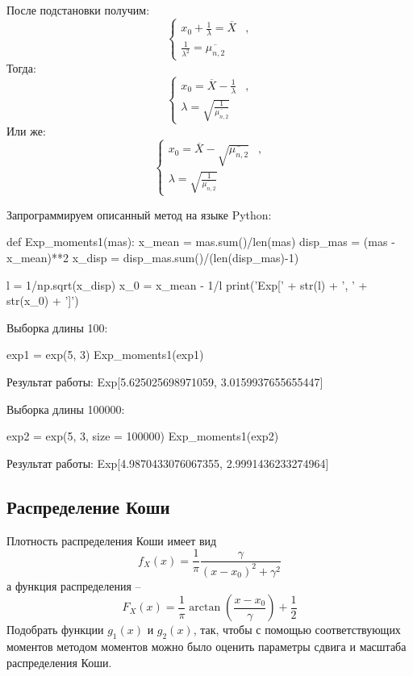 \documentclass{article}
\begin{document}
После подстановки получим:
\begin{equation*}
	\begin{cases}
		x_0 + \frac{1}{\lambda} = \overline{X} &,\\
		\frac{1}{\lambda^2} = \overline{\mu_{n, 2}}
	\end{cases}
\end{equation*}
Тогда:
\begin{equation*}
	\begin{cases}
		x_0 = \overline{X} - \frac{1}{\lambda} &,\\
		\lambda = \sqrt{\frac{1}{\overline{\mu_{n, 2}}}}
	\end{cases}
\end{equation*}
Или же:
\begin{equation*}
	\begin{cases}
		x_0 = \overline{X} - \sqrt{\overline{\mu_{n, 2}}} &,\\
		\lambda = \sqrt{\frac{1}{\overline{\mu_{n, 2}}}}
	\end{cases}
\end{equation*}

Запрограммируем описанный метод на языке Python:
\begin{python}
def Exp_moments1(mas):
	x_mean = mas.sum()/len(mas)
	disp_mas = (mas - x_mean)**2
	x_disp = disp_mas.sum()/(len(disp_mas)-1)

	l = 1/np.sqrt(x_disp)
	x_0 = x_mean - 1/l
	print('Exp[' + str(l) + ', ' + str(x_0) + ']')
\end{python}

Выборка длины 100:
\begin{python}
exp1 = exp(5, 3)
Exp_moments1(exp1)
\end{python}

Результат работы:
Exp[5.625025698971059, 3.0159937655655447]


Выборка длины 100000:
\begin{python}
exp2 = exp(5, 3, size = 100000)
Exp_moments1(exp2)
\end{python}

Результат работы:
Exp[4.9870433076067355, 2.9991436233274964]

\subsection{Распределение Коши}
Плотность распределения Коши имеет вид
\[f_X(x) = \frac{1}{\pi}\frac{\gamma}{(x-x_0)^2+\gamma^2}\]
а функция распределения – 
\[F_X(x) = \frac{1}{\pi}\arctan{\left(\frac{x-x_0}{\gamma}\right)} + \frac{1}{2}\]
Подобрать функции $g_1(x)$ и $g_2(x)$, так, чтобы с помощью соответствующих моментов методом моментов можно было оценить параметры сдвига и масштаба распределения Коши. 
\end{document}
